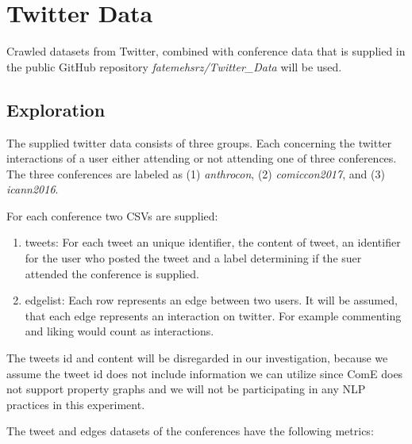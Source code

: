 \documentclass[sigconf]{acmart}
\begin{document}
\section{Twitter Data} \label{twitter_data}

Crawled datasets from Twitter, combined with conference data that is supplied in the public GitHub repository \textit{fatemehsrz/Twitter\_Data} will be used.\cite{TwitterData}

\subsection{Exploration}

The supplied twitter data consists of three groups. Each concerning the twitter interactions of a user either attending or not attending one of three conferences. The three conferences are labeled as (1) \textit{anthrocon}, (2) \textit{comiccon2017}, and (3) \textit{icann2016}.

For each conference two CSVs are supplied:

\begin{enumerate}
	\item tweets: For each tweet an unique identifier, the content of tweet, an identifier for the user who posted the tweet and a label determining if the suer attended the conference is supplied. 
	\item edgelist: Each row represents an edge between two users. It will be assumed, that each edge represents an interaction on twitter. For example commenting and liking would count as interactions.
\end{enumerate}

The tweets id and content will be disregarded in our investigation, because we assume the tweet id does not include information we can utilize since ComE does not support property graphs and we will not be participating in any NLP practices in this experiment.

The tweet and edges datasets of the conferences have the following metrics:
\end{document}
